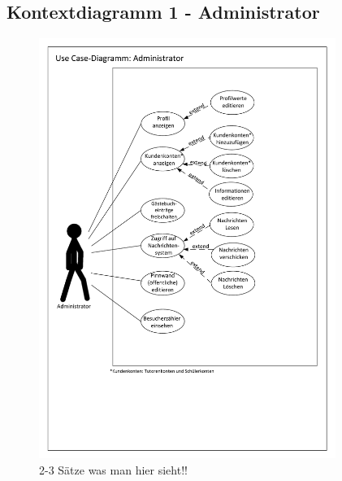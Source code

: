 \documentclass[10pt,a4paper]{scrartcl}
\begin{document}
\subsection{Kontextdiagramm 1 - Administrator}
\begin{figure}[!htbp]
\includegraphics[width=0.86\textwidth]{./Source/UseCaseAdministrator_11.pdf} \caption{2-3 Sätze was man hier sieht!!}
\end{figure}
\newpage
\end{document}
